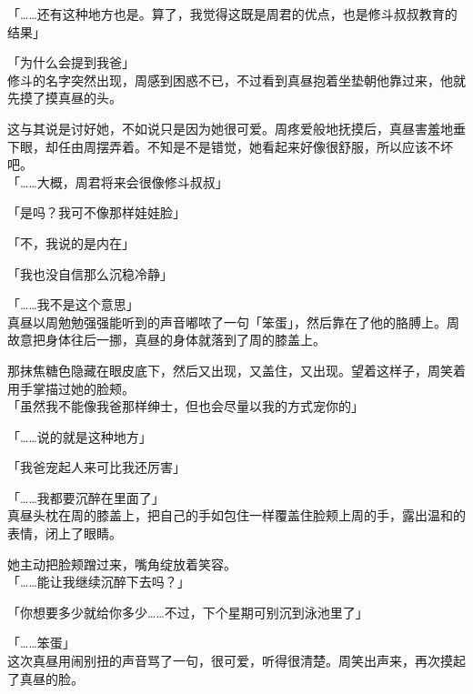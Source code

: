 「……还有这种地方也是。算了，我觉得这既是周君的优点，也是修斗叔叔教育的结果」

「为什么会提到我爸」\\

修斗的名字突然出现，周感到困惑不已，不过看到真昼抱着坐垫朝他靠过来，他就先摸了摸真昼的头。

这与其说是讨好她，不如说只是因为她很可爱。周疼爱般地抚摸后，真昼害羞地垂下眼，却任由周摆弄着。不知是不是错觉，她看起来好像很舒服，所以应该不坏吧。\\

「……大概，周君将来会很像修斗叔叔」

「是吗？我可不像那样娃娃脸」

「不，我说的是内在」

「我也没自信那么沉稳冷静」

「……我不是这个意思」\\

真昼以周勉勉强强能听到的声音嘟哝了一句「笨蛋」，然后靠在了他的胳膊上。周故意把身体往后一挪，真昼的身体就落到了周的膝盖上。

那抹焦糖色隐藏在眼皮底下，然后又出现，又盖住，又出现。望着这样子，周笑着用手掌描过她的脸颊。\\

「虽然我不能像我爸那样绅士，但也会尽量以我的方式宠你的」

「……说的就是这种地方」

「我爸宠起人来可比我还厉害」

「……我都要沉醉在里面了」\\

真昼头枕在周的膝盖上，把自己的手如包住一样覆盖住脸颊上周的手，露出温和的表情，闭上了眼睛。

她主动把脸颊蹭过来，嘴角绽放着笑容。\\

「……能让我继续沉醉下去吗？」

「你想要多少就给你多少……不过，下个星期可别沉到泳池里了」

「……笨蛋」\\

这次真昼用闹别扭的声音骂了一句，很可爱，听得很清楚。周笑出声来，再次摸起了真昼的脸。

